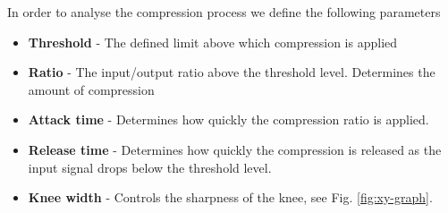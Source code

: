In order to analyse the compression process we define the following parameters
\begin{itemize}
\item{\textbf{Threshold} - The defined limit above which compression is applied }
\item{\textbf{Ratio} - The input/output ratio above the threshold level. Determines the amount of compression}
\item{\textbf{Attack time} - Determines how quickly the compression ratio is applied.}
\item{\textbf{Release time} - Determines how quickly the compression is released as the input signal drops below the threshold level.}
\item{\textbf{Knee width} - Controls the sharpness of the knee, see Fig. \ref{fig:xy-graph}.}
\end{itemize}




